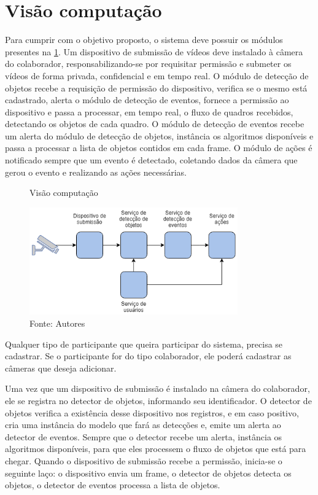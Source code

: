 \documentclass[]{politex}
\begin{document}
\section{Visão computação}
Para cumprir com o objetivo proposto, o sistema deve possuir os módulos presentes na \ref{fig:visaoComputacao}. Um dispositivo de submissão de vídeos deve instalado à câmera do colaborador, responsabilizando-se por requisitar permissão e submeter os vídeos de forma privada, confidencial e em tempo real. O módulo de detecção de objetos recebe a requisição de permissão do dispositivo, verifica se o mesmo está cadastrado, alerta o módulo de detecção de eventos, fornece a permissão ao dispositivo e passa a processar, em tempo real, o fluxo de quadros recebidos, detectando os objetos de cada quadro. O módulo de detecção de eventos recebe um alerta do módulo de detecção de objetos, instância os algoritmos disponíveis e passa a processar a lista de objetos contidos em cada frame. O módulo de ações é notificado sempre que um evento é detectado, coletando dados da câmera que gerou o evento e realizando as ações necessárias.

\begin{figure}[H]
    \centering
    \caption{Visão computação}
    \includegraphics[width=0.8\textwidth]{Visao_Computacao}
    \caption*{Fonte: Autores}
    \label{fig:visaoComputacao}
\end{figure}

Qualquer tipo de participante que queira participar do sistema, precisa se cadastrar. Se o participante for do tipo colaborador, ele poderá cadastrar as câmeras que deseja adicionar.

Uma vez que um dispositivo de submissão é instalado na câmera do colaborador, ele se registra no detector de objetos, informando seu identificador. O detector de objetos verifica a existência desse dispositivo nos registros, e em caso positivo, cria uma instância do modelo que fará as detecções e, emite um alerta ao detector de eventos. Sempre que o detector recebe um alerta, instância os algoritmos disponíveis, para que eles processem o fluxo de objetos que está para chegar. Quando o dispositivo de submissão recebe a permissão, inicia-se o seguinte laço: o dispositivo envia um frame, o detector de objetos detecta os objetos, o detector de eventos processa a lista de objetos.
\end{document}
